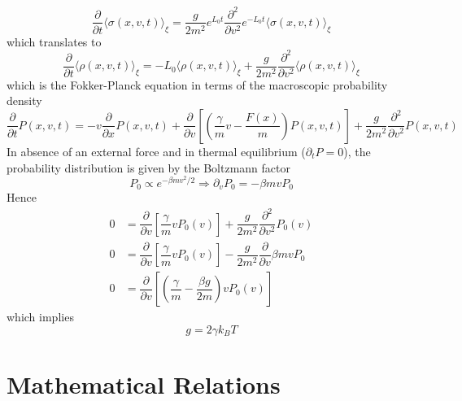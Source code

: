\documentclass[aps,prb,onecolumn,notitlepage,showpacs,floatfix,superscriptaddress]{revtex4-1}
\begin{document}
\begin{equation}
\dfrac{\partial}{\partial t}\langle \sigma(x,v,t) \rangle_\xi = \dfrac{g}{2m^2}  e^{L_0 t}  \dfrac{\partial^2}{\partial v^2} e^{-L_0 t}  \langle \sigma(x,v,t) \rangle_\xi
\end{equation}
which translates to
\begin{equation}
\dfrac{\partial}{\partial t}\langle \rho(x,v,t) \rangle_\xi = -L_0 \langle \rho(x,v,t) \rangle_\xi + \dfrac{g}{2m^2}  \dfrac{\partial^2}{\partial v^2}  \langle \rho(x,v,t) \rangle_\xi
\end{equation}
which is the Fokker-Planck equation in terms of the macroscopic probability density
\begin{equation}
\dfrac{\partial}{\partial t} P(x,v,t) = - v \dfrac{\partial}{\partial x}  P(x,v,t) + \dfrac{\partial}{\partial v} \left[ \left(\dfrac{\gamma}{m} v  -  \dfrac{F(x)}{m} \right)  P(x,v,t) \right] + \dfrac{g}{2m^2}  \dfrac{\partial^2}{\partial v^2}  P(x,v,t) 
\end{equation}
%
In absence of an external force and in thermal equilibrium ($\partial_t P = 0$), the probability distribution is given by the Boltzmann factor
\begin{equation}
P_0 \propto e^{-\beta m v^2/2} \Rightarrow \partial_v P_0 = -\beta m v P_0
\end{equation}
Hence
\begin{equation}
\begin{split}
0 &= \dfrac{\partial}{\partial v} \left[ \dfrac{\gamma}{m} v   P_0(v) \right] + \dfrac{g}{2m^2}  \dfrac{\partial^2}{\partial v^2} P_0(v) \\
0 &= \dfrac{\partial}{\partial v} \left[ \dfrac{\gamma}{m} v P_0(v) \right] - \dfrac{g}{2m^2}  \dfrac{\partial}{\partial v} \beta m v P_0 \\
0 &= \dfrac{\partial}{\partial v} \left[ \left(\dfrac{\gamma}{m} - \dfrac{\beta g}{2m}\right)  v P_0(v) \right]
\end{split}
\end{equation}
which implies 
\begin{equation}
g=2 \gamma k_B T 
\end{equation}
\section*{Mathematical Relations}
\end{document}
